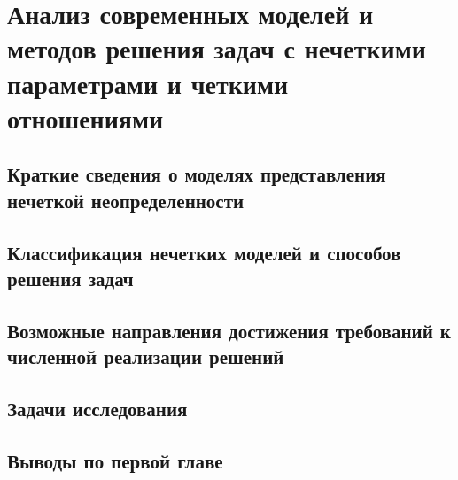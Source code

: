 \chapter{Анализ современных моделей и методов решения задач с нечеткими параметрами и четкими отношениями}
\label{chapter1}

\section{Краткие сведения о моделях представления нечеткой неопределенности}
\label{chapter1_1}


\section{Классификация нечетких моделей и способов решения задач} 
\label{chapter1_2}


\section{Возможные направления достижения требований к численной реализации решений} 
\label{chapter1_3}


\section{Задачи исследования} 
\label{chapter1_4}


\section{Выводы по первой главе}
\label{chapter1_5}
